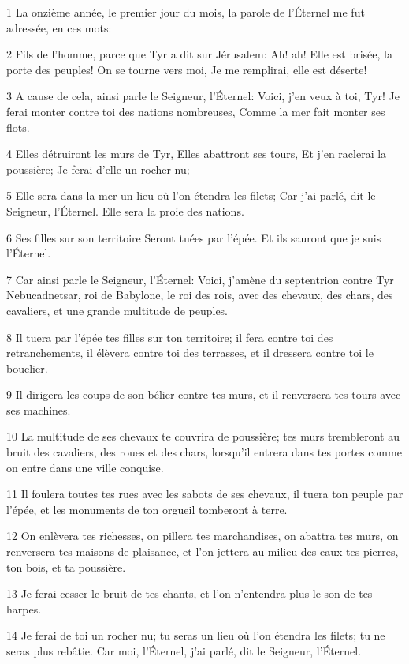 \par 1 La onzième année, le premier jour du mois, la parole de l'Éternel me fut adressée, en ces mots:
\par 2 Fils de l'homme, parce que Tyr a dit sur Jérusalem: Ah! ah! Elle est brisée, la porte des peuples! On se tourne vers moi, Je me remplirai, elle est déserte!
\par 3 A cause de cela, ainsi parle le Seigneur, l'Éternel: Voici, j'en veux à toi, Tyr! Je ferai monter contre toi des nations nombreuses, Comme la mer fait monter ses flots.
\par 4 Elles détruiront les murs de Tyr, Elles abattront ses tours, Et j'en raclerai la poussière; Je ferai d'elle un rocher nu;
\par 5 Elle sera dans la mer un lieu où l'on étendra les filets; Car j'ai parlé, dit le Seigneur, l'Éternel. Elle sera la proie des nations.
\par 6 Ses filles sur son territoire Seront tuées par l'épée. Et ils sauront que je suis l'Éternel.
\par 7 Car ainsi parle le Seigneur, l'Éternel: Voici, j'amène du septentrion contre Tyr Nebucadnetsar, roi de Babylone, le roi des rois, avec des chevaux, des chars, des cavaliers, et une grande multitude de peuples.
\par 8 Il tuera par l'épée tes filles sur ton territoire; il fera contre toi des retranchements, il élèvera contre toi des terrasses, et il dressera contre toi le bouclier.
\par 9 Il dirigera les coups de son bélier contre tes murs, et il renversera tes tours avec ses machines.
\par 10 La multitude de ses chevaux te couvrira de poussière; tes murs trembleront au bruit des cavaliers, des roues et des chars, lorsqu'il entrera dans tes portes comme on entre dans une ville conquise.
\par 11 Il foulera toutes tes rues avec les sabots de ses chevaux, il tuera ton peuple par l'épée, et les monuments de ton orgueil tomberont à terre.
\par 12 On enlèvera tes richesses, on pillera tes marchandises, on abattra tes murs, on renversera tes maisons de plaisance, et l'on jettera au milieu des eaux tes pierres, ton bois, et ta poussière.
\par 13 Je ferai cesser le bruit de tes chants, et l'on n'entendra plus le son de tes harpes.
\par 14 Je ferai de toi un rocher nu; tu seras un lieu où l'on étendra les filets; tu ne seras plus rebâtie. Car moi, l'Éternel, j'ai parlé, dit le Seigneur, l'Éternel.
